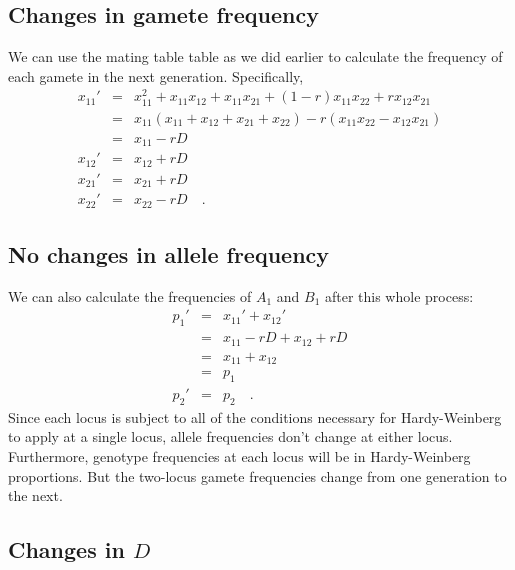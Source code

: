 \documentclass[12pt]{article}
\begin{document}
\subsection*{Changes in gamete frequency}

We can use the mating table table as we did earlier to calculate the
frequency of each gamete in the next generation. Specifically,
\begin{eqnarray*}
x_{11}' &=& x_{11}^2 + x_{11}x_{12} + x_{11}x_{21} + (1-r)x_{11}x_{22}
            + rx_{12}x_{21} \\
        &=& x_{11}(x_{11} + x_{12} + x_{21} + x_{22})
            - r(x_{11}x_{22} - x_{12}x_{21}) \\
        &=& x_{11} - rD \\
x_{12}' &=& x_{12} + rD \\
x_{21}' &=& x_{21} + rD \\
x_{22}' &=& x_{22} - rD \quad .
\end{eqnarray*}

\subsection*{No changes in allele frequency}

We can also calculate the frequencies of $A_1$ and $B_1$ after this
whole process:
\begin{eqnarray*}
p_1' &=& x_{11}' + x_{12}' \\
     &=& x_{11} - rD + x_{12} + rD \\
     &=& x_{11} + x_{12} \\
     &=& p_1 \\
p_2' &=& p_2 \quad .
\end{eqnarray*}
Since each locus is subject to all of the conditions necessary for
Hardy-Weinberg to apply at a single locus, allele frequencies don't
change at either locus. Furthermore, genotype frequencies at each
locus will be in Hardy-Weinberg proportions. But the two-locus gamete
frequencies change from one generation to the next.

\subsection*{Changes in $D$}
\end{document}
